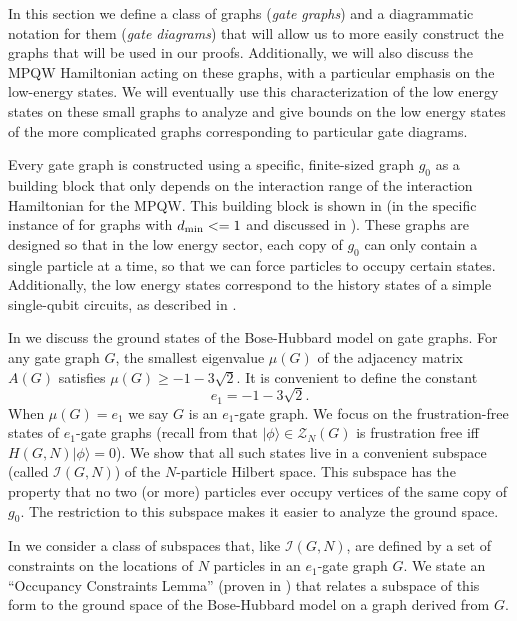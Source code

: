 \documentclass[../thesis-main/thesis-main]{subfiles}
\begin{document}
In this section we define a class of graphs (\emph{gate graphs}) and a diagrammatic notation for them (\emph{gate diagrams}) that will allow us to more easily construct the graphs that will be used in our proofs.  Additionally, we will also discuss the MPQW Hamiltonian acting on these graphs, with a particular emphasis on the low-energy states.  We will eventually use this characterization of the low energy states on these small graphs to analyze and give bounds on the low energy states of the more complicated graphs corresponding to particular gate diagrams.

Every gate graph is constructed using a specific, finite-sized graph $g_{0}$ as a building block that only depends on the interaction range of the interaction Hamiltonian for the MPQW.  This building block is shown in  (in the specific instance of for graphs with $d_{\text{min}} <= 1$ and discussed in ).  These graphs are designed so that in the low energy sector, each copy of $g_0$ can only contain a single particle at a time, so that we can force particles to occupy certain states.  Additionally, the low energy states correspond to the history states of a simple single-qubit circuits, as described in .

In  we discuss the ground states of the Bose-Hubbard model on gate graphs. For any gate graph $G$, the smallest eigenvalue $\mu(G)$ of the adjacency matrix $A(G)$ satisfies $\mu(G)\geq-1-3\sqrt{2}$. It is convenient to define the constant
\begin{equation}
e_{1}=-1-3\sqrt{2}.\label{eq:e1_defn}
\end{equation}
When $\mu(G)=e_{1}$ we say $G$ is an $e_{1}$-gate graph. We focus on the frustration-free states of $e_1$-gate graphs (recall from  that $|\phi\rangle\in \mathcal{Z}_N(G)$ is frustration free iff $H(G,N)|\phi\rangle=0$). We show that all such states live in a convenient subspace (called $\mathcal{I}(G,N)$) of the $N$-particle Hilbert space. This subspace has the property that no two (or more) particles ever occupy vertices of the same copy of $g_{0}$. The restriction to this subspace makes it easier to analyze the ground space.

In  we consider a class of subspaces that, like $\mathcal{I}(G,N)$, are defined by a set of constraints on the locations of $N$ particles in an $e_{1}$-gate graph $G$. We state an ``Occupancy Constraints Lemma'' (proven in ) that relates a subspace of this form to the ground space of the Bose-Hubbard model on a graph derived from $G$.
\end{document}
